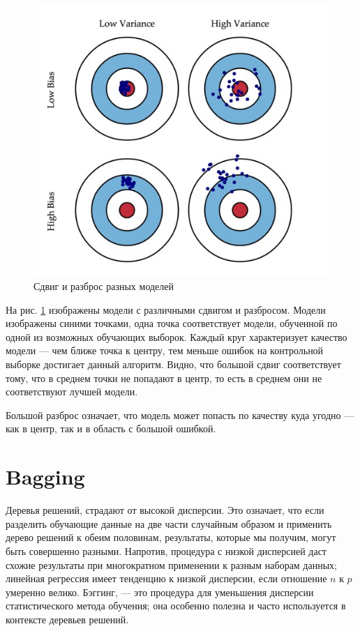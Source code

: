 \documentclass{article}
\begin{document}
\begin{figure}[!ht]
	\centering
	\includegraphics[width=1\textwidth]{img/bias_var.jpg}
	\caption{Сдвиг и разброс разных моделей}
	\label{fig:bias_var}
\end{figure}


На рис. \ref{fig:bias_var} изображены модели с различными сдвигом и разбросом. Модели изображены синими точками, одна точка соответствует модели, обученной по одной из возможных обучающих выборок. Каждый круг характеризует качество модели --- чем ближе точка к центру, тем меньше ошибок на контрольной выборке достигает данный алгоритм. Видно, что большой сдвиг соответствует тому, что в среднем точки не попадают в центр, то есть в среднем они не соответствуют лучшей модели.

Большой разброс означает, что модель может попасть по качеству куда угодно --- как в центр, так и в область с большой ошибкой.

\section{Bagging}

Деревья решений, страдают от высокой дисперсии. Это означает, что если разделить обучающие данные на две части случайным образом и применить дерево решений к обеим половинам, результаты, которые мы получим, могут быть совершенно разными. Напротив, процедура с низкой дисперсией даст схожие результаты при многократном применении к разным наборам данных; линейная регрессия имеет тенденцию к низкой дисперсии, если отношение $n$ к $p$ умеренно велико. Бэггинг, --- это процедура для уменьшения дисперсии статистического метода обучения; она особенно полезна и часто используется в контексте деревьев решений.
\end{document}
